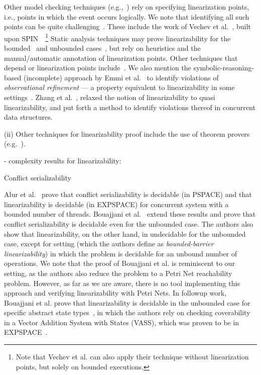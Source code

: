 Other model checking techniques (e.g.,~\cite{Fl04}) rely on specifying linearization points, i.e., points in which the event occurs logically. We note that identifying all such points can be quite challenging~\cite{VeYaYo09}.
%
These include the work of Vechev et al.~\cite{VeYaYo09}, built upon SPIN~\cite{Ho97}~\footnote{Note that Vechev et al. can also apply their technique without linearization points, but solely on bounded executions.}
%
Static analysis techniques may prove linearizability for the bounded~\cite{AmRiReSaYa07} and unbounded cases~\cite{BeLeMaRaSa08, Va09, Va10}, but rely on heuristics and the manual/automatic annotation of linearization points. Other techniques that depend or linearization points include~\cite{OhRiVeYaYo10}.
%
We also mention the symbolic-reasoning-based (incomplete) approach by Emmi et al.~\cite{EmEnHa15} to identify violations of \textit{observational refinement} --- a property equivalent to linearizability in some settings~\cite{FiOhRiYa10, BoEmCoHa15}.
%
Zhang et al.~\cite{ZhChWa13}, relaxed the notion of linearizability to quasi linearizability, and put forth a method to identify violations thereof in concurrent data structures.







(ii) Other techniques for linearizability proof include the use of theorem provers (e.g.~\cite{CoDoGr05, DeScWe11}).


- complexity results for linearizability:

Conflict serializability

Alur et al.~\cite{AlMcPe96} prove that conflict serializability is decidable 
(in PSPACE) and that linearizability is decidable (in EXPSPACE) for concurrent 
system with a bounded number of threads.
%
Bouajjani et al.~\cite{BoEmEnHa13} extend these results and prove that conflict serializability is decidable even for the unbounded case. The authors also show that linearizability, on the other hand, in undecidable for the unbounded case, except for setting (which the authors define as \textit{bounded-barrier linearizability}) in which the problem is decidable for an unbound number of operations.
%
We note that the proof of Bouajjani et al. is reminiscent to our setting, as the authors also reduce the problem to a Petri Net reachability problem.
%
However, as far as we are aware, there is no tool implementing this approach and verifying linearizability with Petri Nets.
%
In followup work, Bouajjani et al. prove that linearizability is decidable in 
the unbounded case for specific abstract state types~\cite{BoEmEnHa18}, in 
which the authors rely on checking coverability in a Vector Addition System 
with States (VASS), which was proven to be in EXPSPACE~\cite{Ra78}.

